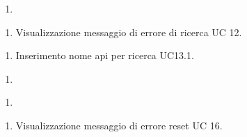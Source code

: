 \begin{usecase}{}{}\label{uc:}
    \usecasepre{}
    \usecasedesc{}
    \usecasepost{}

    \usecasemain{}
        \begin{enumerate}
            \item 
        \end{enumerate}

    \usecaseext{}
        \begin{enumerate}
            \item Visualizzazione messaggio di errore di ricerca UC 12.
        \end{enumerate}

    \usecasegen{}
        \begin{enumerate}
            \item Inserimento nome api per ricerca UC13.1.
        \end{enumerate}

\end{usecase}



\begin{usecase}{}{}\label{uc:}
    \usecasepre{}
    \usecasedesc{}
    \usecasepost{}

    \usecasemain{}
        \begin{enumerate}
            \item 
        \end{enumerate}

\end{usecase}








\begin{usecase}{}{}\label{uc:}
    \usecasepre{}
    \usecasedesc{}
    \usecasepost{}

    \usecasemain{}
        \begin{enumerate}
            \item 
        \end{enumerate}

    \usecaseext{}
        \begin{enumerate}
            \item Visualizzazione messaggio di errore reset UC 16.
        \end{enumerate}

\end{usecase}


